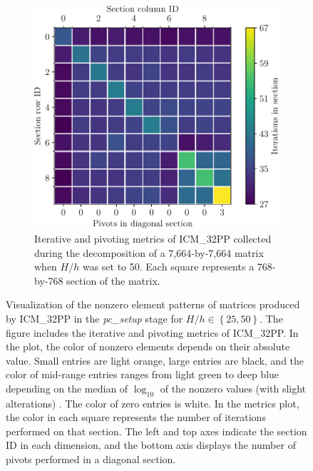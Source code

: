 \begin{figure}[ht!]
\begin{subfigure}[t]{0.51\textwidth}
		\includegraphics[width=\textwidth]{images/ch03/input-matrices/bddcml-benchmark/poc-50_4_2_icm32pp_metrics.pdf}
		\caption{Iterative and pivoting metrics of ICM\_32PP collected during the decomposition of a 7,664-by-7,664 matrix when $H/h$ was set to 50.
			Each square represents a 768-by-768 section of the matrix.
		}
		\label{Figure:comparing-decomposers-and-solvers->bddcml-benchmark->benchmark-results->speedup-comparison-of-decomposers-in-pc-setup-stage->speedup-comparison->ICM_32PP->50-4-2->metrics}
	\end{subfigure}

	\caption{Visualization of the nonzero element patterns of  matrices produced by ICM\_32PP in the \textit{pc\_setup} stage for $H/h \in \left\{25, 50\right\}$.
		The figure includes the iterative and pivoting metrics of ICM\_32PP.
		In the  plot, the color of nonzero elements depends on their absolute value.
		Small entries are light orange, large entries are black, and the color of mid-range entries ranges from light green to deep blue depending on the median of $\log_{10}$ of the nonzero values (with slight alterations) \cite{Davis2006}.
		The color of zero entries is white.
		In the metrics plot, the color in each square represents the number of iterations performed on that section.
		The left and top axes indicate the section ID in each dimension, and the bottom axis displays the number of pivots performed in a diagonal section.
	}
	\label{Figure:comparing-decomposers-and-solvers->bddcml-benchmark->benchmark-results->speedup-comparison-of-decomposers-in-pc-setup-stage->speedup-comparison->ICM_32PP->LU-and-metrics-examples}
\end{figure}

